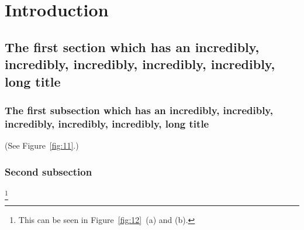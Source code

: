 \chapter{Introduction}

\section{The first section which has an incredibly, incredibly, 
  incredibly, incredibly, incredibly, long title}

\subsection{The first subsection which has an incredibly, incredibly, 
  incredibly, incredibly, incredibly, long title}
\lipsum[5-6] (See Figure~\ref{fig:11}.)



\subsection{Second subsection}
\lipsum[8]\footnote{This can be seen in Figure~\ref{fig:12}~(a) and (b).}

